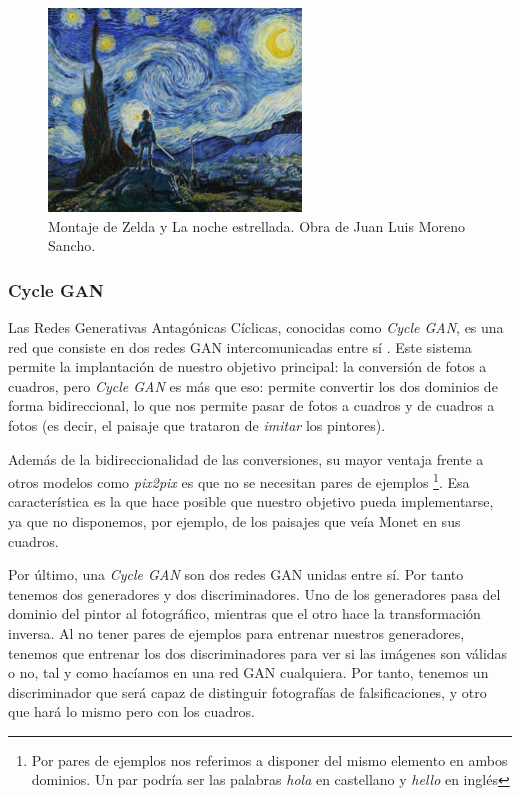 \documentclass[../main.tex]{subfiles}
\begin{document}
\begin{figure}[h]
    \centering
    \includegraphics[width=0.6\textwidth]{imagenes/chibi_jl.jpg}
    \caption[Montaje de Zelda y La noche estrellada]{Montaje de Zelda y La noche estrellada. Obra de Juan Luis Moreno Sancho.}
    \label{fig:chibi_jl}
\end{figure}

\subsubsection{Cycle GAN}
\label{Cycle GAN}

Las Redes Generativas Antagónicas Cíclicas, conocidas como \textit{Cycle GAN}, es una red que consiste en dos redes GAN intercomunicadas entre sí \cite{Zhu2017}. Este sistema permite la implantación de nuestro objetivo principal: la conversión de fotos a cuadros, pero \textit{Cycle GAN} es más que eso: permite convertir los dos dominios de forma bidireccional, lo que nos permite pasar de fotos a cuadros y de cuadros a fotos (es decir, el paisaje que trataron de \textit{imitar} los pintores). \newline

Además de la bidireccionalidad de las conversiones, su mayor ventaja frente a otros modelos como \textit{pix2pix} es que no se necesitan pares de ejemplos \footnote{Por pares de ejemplos nos referimos a disponer del mismo elemento en ambos dominios. Un par podría ser las palabras \textit{hola} en castellano y \textit{hello} en inglés}. Esa característica es la que hace posible que nuestro objetivo pueda implementarse, ya que no disponemos, por ejemplo, de los paisajes que veía Monet en sus cuadros. \newline

Por último, una \textit{Cycle GAN} son dos redes GAN unidas entre sí. Por tanto tenemos dos generadores y dos discriminadores. Uno de los generadores pasa del dominio del pintor al fotográfico, mientras que el otro hace la transformación inversa. Al no tener pares de ejemplos para entrenar nuestros generadores, tenemos que entrenar los dos discriminadores para ver si las imágenes son válidas o no, tal y como hacíamos en una red GAN cualquiera. Por tanto, tenemos un discriminador que será capaz de distinguir fotografías de falsificaciones, y otro que hará lo mismo pero con los cuadros. \cite{Foster2019} \newline
\end{document}
